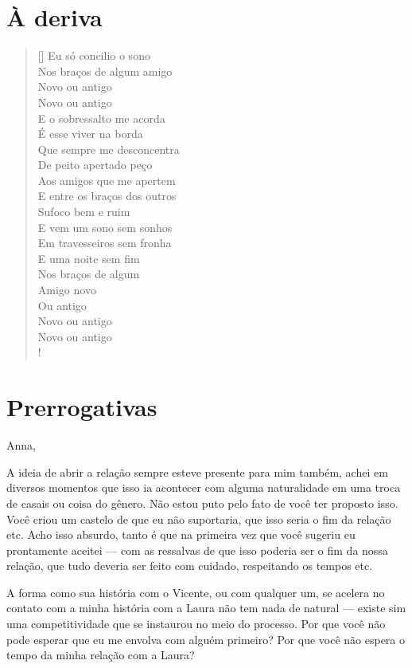 \chapter{À deriva}


\begin{verse}[\versewidth]
Eu só concilio o sono\\
Nos braços de algum amigo\\
Novo ou antigo\\
Novo
ou antigo\\
E o sobressalto me acorda\\
É esse viver na borda\\
Que sempre
me desconcentra\\
De peito apertado peço\\
Aos amigos que me apertem\\
E
entre os braços dos outros\\
Sufoco bem e ruim\\
E vem um sono sem
sonhos\\
Em travesseiros sem fronha\\
E uma noite sem fim\\
 Nos braços de
algum\\
 Amigo novo\\
 Ou antigo\\
 Novo ou antigo\\
 Novo ou antigo\\!
\end{verse} 

\chapter{Prerrogativas}




Anna,

\medskip{} 

A ideia de abrir a relação sempre esteve presente para mim também, achei
em diversos momentos que isso ia acontecer com alguma naturalidade em
uma troca de casais ou coisa do gênero. Não estou puto pelo fato de você
ter proposto isso. Você criou um castelo de que eu não suportaria, que
isso seria o fim da relação etc. Acho isso absurdo, tanto é que na
primeira vez que você sugeriu eu prontamente aceitei --- com as
ressalvas de que isso poderia ser o fim da nossa relação, que tudo
deveria ser feito com cuidado, respeitando os tempos etc.

A forma como sua história com o Vicente, ou com qualquer um, se acelera
no contato com a minha história com a Laura não tem nada de natural ---
existe sim uma competitividade que se instaurou no meio do processo. Por
que você não pode esperar que eu me envolva com alguém primeiro? Por que
você não espera o tempo da minha relação com a Laura?

